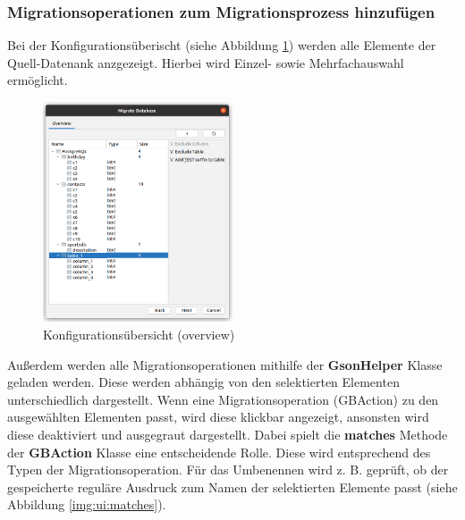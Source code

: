 \subsubsection{Migrationsoperationen zum Migrationsprozess hinzufügen}
Bei der Konfigurationsüberischt (siehe Abbildung \ref{img:ui:overviewSingleAdd}) werden alle Elemente der Quell-Datenank anzgezeigt. Hierbei wird Einzel- sowie Mehrfachauswahl ermöglicht. \\
\begin{figure}[h]
	\centering
	\includegraphics[width=0.5\textwidth]{images/ui/overviewSingleAdd}
	\caption{Konfigurationsübersicht (overview)}
	\label{img:ui:overviewSingleAdd}
\end{figure}
Außerdem werden alle Migrationsoperationen mithilfe der \textbf{GsonHelper} Klasse geladen werden. Diese werden abhängig von den selektierten Elementen unterschiedlich dargestellt. Wenn eine Migrationsoperation (GBAction) zu den ausgewählten Elementen passt, wird diese klickbar angezeigt, ansonsten wird diese deaktiviert und ausgegraut dargestellt. Dabei spielt die \textbf{matches} Methode der \textbf{GBAction} Klasse eine entscheidende Rolle. Diese wird entsprechend des Typen der Migrationsoperation. Für das Umbenennen wird z. B. geprüft, ob der gespeicherte reguläre Ausdruck zum Namen der selektierten Elemente passt (siehe Abbildung \ref{img:ui:matches}).

